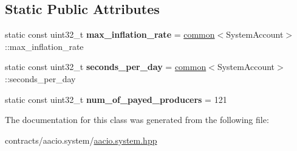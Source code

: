 \subsection*{Static Public Attributes}
\begin{DoxyCompactItemize}
\item 
\mbox{\label{classaaciosystem_1_1contract_aa8bff8ec87eb4e9c93e0c61e134cc638}} 
static const uint32\+\_\+t {\bfseries max\+\_\+inflation\+\_\+rate} = \mbox{\hyperlink{classaaciosystem_1_1common}{common}}$<$System\+Account$>$\+::max\+\_\+inflation\+\_\+rate
\item 
\mbox{\label{classaaciosystem_1_1contract_ad551ad69dc6516d08e87a0ee9bb87d62}} 
static const uint32\+\_\+t {\bfseries seconds\+\_\+per\+\_\+day} = \mbox{\hyperlink{classaaciosystem_1_1common}{common}}$<$System\+Account$>$\+::seconds\+\_\+per\+\_\+day
\item 
\mbox{\label{classaaciosystem_1_1contract_a45d8eb0bd2e3b442c12c68f6c723487d}} 
static const uint32\+\_\+t {\bfseries num\+\_\+of\+\_\+payed\+\_\+producers} = 121
\end{DoxyCompactItemize}


The documentation for this class was generated from the following file\+:\begin{DoxyCompactItemize}
\item 
contracts/aacio.\+system/\mbox{\hyperlink{aacio_8system_8hpp}{aacio.\+system.\+hpp}}\end{DoxyCompactItemize}
